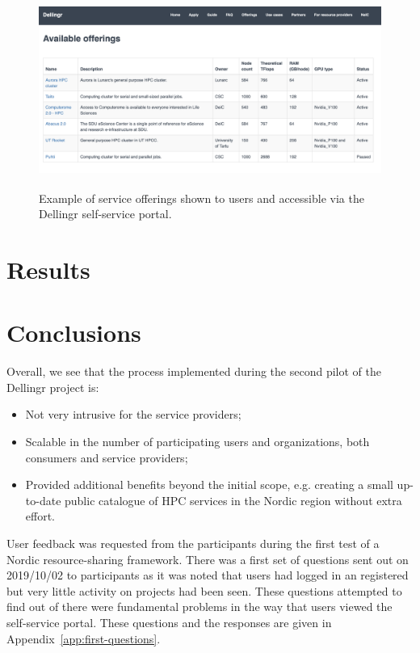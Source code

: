 \documentclass{article}
\newcommand{\dell}{Dellingr\xspace}
\newcommand{\pilot}{first test of a Nordic resource-sharing framework\xspace}
\begin{document}
\begin{figure}
\centering
\includegraphics[height=180pt]{Dellingr-list-of-resource.png}
\caption{Example of service offerings shown to users and accessible via the \dell self-service portal.}
\end{figure}

\section{Results}
\label{sec:results}


\section{Conclusions}

Overall, we see that the process implemented during the second pilot of the \dell project is:
\begin{itemize}
\item Not very intrusive for the service providers;
\item Scalable in the number of participating users and organizations, both consumers and service providers;
\item Provided additional benefits beyond the initial scope, e.g. creating a small up-to-date public catalogue of HPC services in the Nordic region without extra effort.
\end{itemize} 

User feedback was requested from the participants during the \pilot.
There was a first set of questions sent out on 2019/10/02 to participants as it was noted that users had logged in an registered but very little activity on projects had been seen.
These questions attempted to find out of there were fundamental problems in the way that users viewed the self-service portal.
These questions and the responses are given in Appendix~\ref{app:first-questions}.
\end{document}
